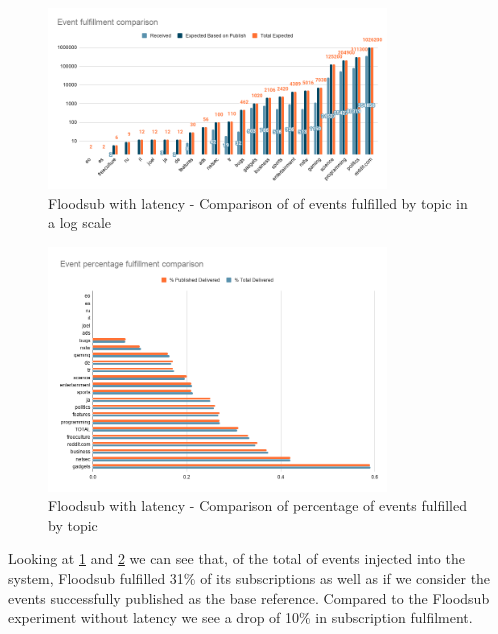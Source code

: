 \begin{figure}[!htb]
  \centering
  \includegraphics[width=0.8\textwidth]{img/graph-floodsub-latency-event-fulfillment-comparison.png}
  \caption{Floodsub with latency - Comparison of of events fulfilled by topic in a log scale}
  \label{fig:graph-floodsub-latency-event-fulfillment-comparison}
\end{figure}

\begin{figure}[!htb]
  \centering
  \includegraphics[width=0.8\textwidth]{img/graph-floodsub-latency-event-percentage-fulfillment-comparison.png}
  \caption{Floodsub with latency - Comparison of percentage of events fulfilled by topic}
  \label{fig:graph-floodsub-latency-event-percentage-fulfillment-comparison}
\end{figure}

Looking at \ref{fig:graph-floodsub-latency-event-fulfillment-comparison} and
\ref{fig:graph-floodsub-latency-event-percentage-fulfillment-comparison} we can
see that, of the total of events injected into the system, Floodsub fulfilled
31\% of its subscriptions as well as if we consider the events successfully
published as the base reference. Compared to the Floodsub experiment without
latency we see a drop of 10\% in subscription fulfilment.

